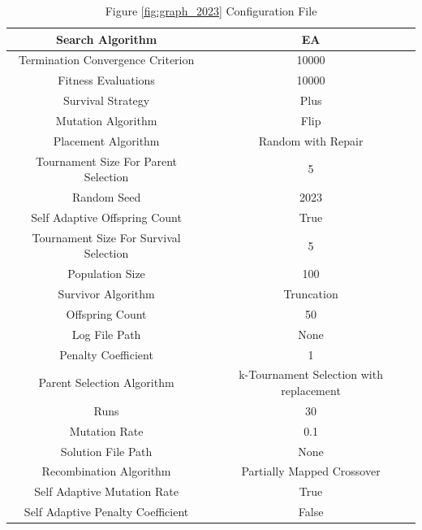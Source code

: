 \documentclass{standalone}
\begin{document}
\begin{table}[!htb]
	\centering
	\caption{Figure \ref{fig:graph_2023} Configuration File}
	\label{tab:graph_2023}
	\begin{tabular}{| c | c |}
		\hline
		Search Algorithm		& EA		 \\
		\hline
		Termination Convergence Criterion		& 10000		 \\
		\hline
		Fitness Evaluations		& 10000		 \\
		\hline
		Survival Strategy		& Plus		 \\
		\hline
		Mutation Algorithm		& Flip		 \\
		\hline
		Placement Algorithm		& Random with Repair		 \\
		\hline
		Tournament Size For Parent Selection		& 5		 \\
		\hline
		Random Seed		& 2023		 \\
		\hline
		Self Adaptive Offspring Count		& True		 \\
		\hline
		Tournament Size For Survival Selection		& 5		 \\
		\hline
		Population Size		& 100		 \\
		\hline
		Survivor Algorithm		& Truncation		 \\
		\hline
		Offspring Count		& 50		 \\
		\hline
		Log File Path		& None		 \\
		\hline
		Penalty Coefficient		& 1		 \\
		\hline
		Parent Selection Algorithm		& k-Tournament Selection with replacement		 \\
		\hline
		Runs		& 30		 \\
		\hline
		Mutation Rate		& 0.1		 \\
		\hline
		Solution File Path		& None		 \\
		\hline
		Recombination Algorithm		& Partially Mapped Crossover		 \\
		\hline
		Self Adaptive Mutation Rate		& True		 \\
		\hline
		Self Adaptive Penalty Coefficient		& False		 \\
		\hline
	\end{tabular}
\end{table}
\end{document}
